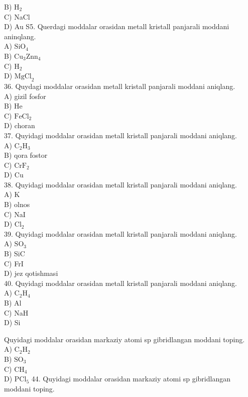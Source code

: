 B) $\mathrm{H}_{2}$\\
C) NaCl\\
D) Au
S5. Querdagi moddalar orasidan metall kristall panjarali moddani aninqlang.\\
A) $\mathrm{SiO}_{4}$\\
B) $\mathrm{Cu}_{3} \mathrm{Zn} \mathrm{n}_{4}$\\
C) $\mathrm{H}_{2}$\\
D) $\mathrm{MgCl}_{2}$\\
36. Quydagi moddalar orasidan metall kristall panjarali moddani aniqlang.\\
A) gizil fosfor\\
B) He\\
C) $\mathrm{FeCl}_{2}$\\
D) choran\\
37. Quyidagi moddalar orasidan metall kristall panjarali moddani aniqlang.\\
A) $\mathrm{C}_{2} \mathrm{H}_{3}$\\
B) qora fostor\\
C) $\mathrm{CrF}_{2}$\\
D) Cu\\
38. Quyidagi moddalar orasidan metall kristall panjarali moddani aniqlang.\\
A) K\\
B) olnos\\
C) NaI\\
D) $\mathrm{Cl}_{2}$\\
39. Quyidagi moddalar orasidan metall kristall panjarali moddani aniqlang.\\
A) $\mathrm{SO}_{3}$\\
B) SiC\\
C) FrI\\
D) jez qotishmasi\\
40. Quyidagi moddalar orasidan metall kristall panjarali moddani aniqlang.\\
A) $\mathrm{C}_{2} \mathrm{H}_{4}$\\
B) Al\\
C) NaH\\
D) Si
  \item Quyidagi moddalar orasidan markaziy atomi sp gibridlangan moddani toping.\\
A) $\mathrm{C}_{2} \mathrm{H}_{2}$\\
B) $\mathrm{SO}_{3}$\\
C) $\mathrm{CH}_{4}$\\
D) $\mathrm{PCl}_{5}$
44. Quyidagi moddalar orasidan markaziy atomi sp gibridlangan moddani toping.\\
